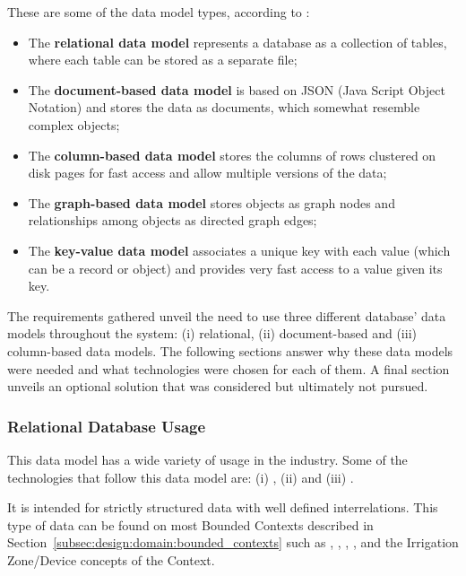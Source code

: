 These are some of the data model types, according to \cite{elmasri2000fundamentals}:

\begin{itemize}
    \item The \textbf{relational data model} represents a database as a collection of tables,
    where each table can be stored as a separate file;
    \item The \textbf{document-based data model} is based on JSON (Java Script
    Object Notation) and stores the data as documents, which somewhat resemble
    complex objects;
    \item The \textbf{column-based data model} stores the columns of rows clustered on disk pages for fast access and allow multiple versions of the data;
    \item The \textbf{graph-based data model} stores objects as graph nodes and relationships among objects as directed graph edges;
    \item The \textbf{key-value data model} associates a unique key with each value (which can be a record or object) and provides very fast access to a value given its key.
\end{itemize}

The requirements gathered unveil the need to use three different database' data models throughout the system: (i) relational, (ii) document-based and (iii) column-based data models. The following sections answer why these data models were needed and what technologies were chosen for each of them. A final section unveils an optional solution that was considered but ultimately not pursued.

\subsubsection{Relational Database Usage}
\label{subsubsec:implementation:decisions:database:relational}

This data model has a wide variety of usage in the industry. Some of the technologies that follow this data model are: (i) , (ii)  and (iii) .

It is intended for strictly structured data with well defined interrelations. This type of data can be found on most Bounded Contexts described in Section~\ref{subsec:design:domain:bounded_contexts} such as , , , ,  and the Irrigation Zone/Device concepts of the  Context.


